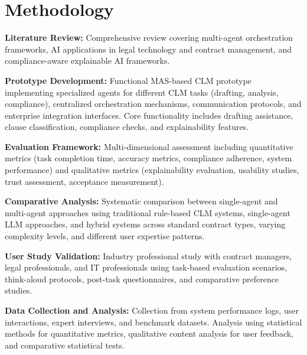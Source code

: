 
\chapter{Methodology}\label{chapter:methodology}

\textbf{Literature Review:} Comprehensive review covering multi-agent orchestration frameworks, AI applications in legal technology and contract management, and compliance-aware explainable AI frameworks.

\textbf{Prototype Development:} Functional MAS-based CLM prototype implementing specialized agents for different CLM tasks (drafting, analysis, compliance), centralized orchestration mechanisms, communication protocols, and enterprise integration interfaces. Core functionality includes drafting assistance, clause classification, compliance checks, and explainability features.

\textbf{Evaluation Framework:} Multi-dimensional assessment including quantitative metrics (task completion time, accuracy metrics, compliance adherence, system performance) and qualitative metrics (explainability evaluation, usability studies, trust assessment, acceptance measurement).

\textbf{Comparative Analysis:} Systematic comparison between single-agent and multi-agent approaches using traditional rule-based CLM systems, single-agent LLM approaches, and hybrid systems across standard contract types, varying complexity levels, and different user expertise patterns.

\textbf{User Study Validation:} Industry professional study with contract managers, legal professionals, and IT professionals using task-based evaluation scenarios, think-aloud protocols, post-task questionnaires, and comparative preference studies.

\textbf{Data Collection and Analysis:} Collection from system performance logs, user interactions, expert interviews, and benchmark datasets. Analysis using statistical methods for quantitative metrics, qualitative content analysis for user feedback, and comparative statistical tests.
